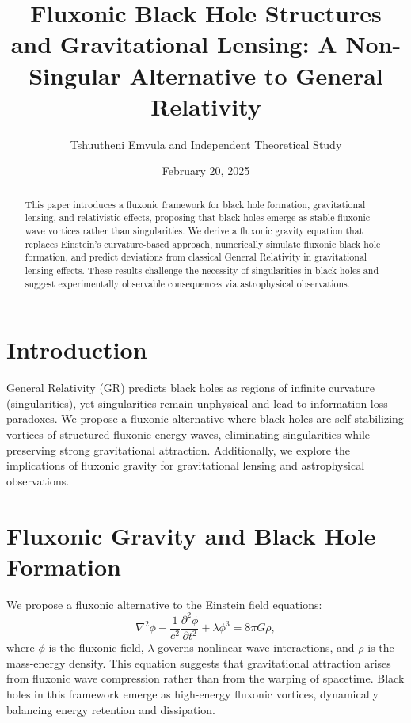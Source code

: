 \documentclass{article}
\title{Fluxonic Black Hole Structures and Gravitational Lensing: A Non-Singular Alternative to General Relativity}
\author{Tshuutheni Emvula and Independent Theoretical Study}
\date{February 20, 2025}
\begin{document}
\maketitle

\begin{abstract}
This paper introduces a fluxonic framework for black hole formation, gravitational lensing, and relativistic effects, proposing that black holes emerge as stable fluxonic wave vortices rather than singularities. We derive a fluxonic gravity equation that replaces Einstein's curvature-based approach, numerically simulate fluxonic black hole formation, and predict deviations from classical General Relativity in gravitational lensing effects. These results challenge the necessity of singularities in black holes and suggest experimentally observable consequences via astrophysical observations.
\end{abstract}

\section{Introduction}
General Relativity (GR) predicts black holes as regions of infinite curvature (singularities), yet singularities remain unphysical and lead to information loss paradoxes. We propose a fluxonic alternative where black holes are self-stabilizing vortices of structured fluxonic energy waves, eliminating singularities while preserving strong gravitational attraction. Additionally, we explore the implications of fluxonic gravity for gravitational lensing and astrophysical observations.

\section{Fluxonic Gravity and Black Hole Formation}
We propose a fluxonic alternative to the Einstein field equations:
\begin{equation}
    \nabla^2 \phi - \frac{1}{c^2} \frac{\partial^2 \phi}{\partial t^2} + \lambda \phi^3 = 8 \pi G \rho,
\end{equation}
where \(\phi\) is the fluxonic field, \(\lambda\) governs nonlinear wave interactions, and \(\rho\) is the mass-energy density. This equation suggests that gravitational attraction arises from fluxonic wave compression rather than from the warping of spacetime. Black holes in this framework emerge as high-energy fluxonic vortices, dynamically balancing energy retention and dissipation.
\end{document}
